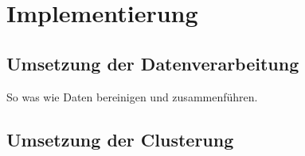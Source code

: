 \chapter{Implementierung}
\section{Umsetzung der Datenverarbeitung}
So was wie Daten bereinigen und zusammenführen.
\section{Umsetzung der Clusterung}
